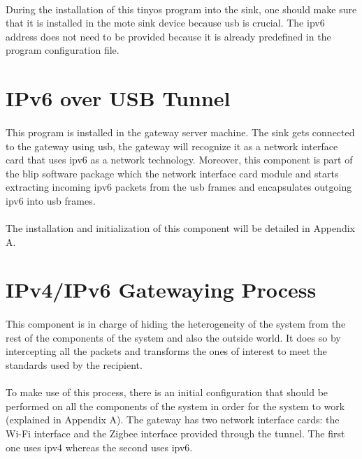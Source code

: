 \documentclass[12pt,a4paper,final]{report}
\begin{document}
\paragraph{}
During the installation of this \gls{tinyos} program into the sink, one should make sure that it is installed in the mote sink device because \gls{usb} is crucial. The \gls{ipv6} address does not need to be provided because it is already predefined in the program configuration file.

\section{IPv6 over USB Tunnel}
\paragraph{}
This program is installed in the gateway server machine. The sink gets connected to the gateway using \gls{usb}, the gateway will recognize it as a network interface card that uses \gls{ipv6} as a network technology. Moreover, this component is part of the \gls{blip} software package which the network interface card module and starts extracting incoming \gls{ipv6} packets from the \gls{usb} frames and encapsulates outgoing \gls{ipv6} into \gls{usb} frames.
\paragraph{}
The installation and initialization of this component will be detailed in Appendix A.
\section{IPv4/IPv6 Gatewaying Process}
\paragraph{}
This component is in charge of hiding the heterogeneity of the system from the rest of the components of the system and also the outside world. It does so by intercepting all the packets and transforms the ones of interest to meet the standards used by the recipient.
\paragraph{}
To make use of this process, there is an initial configuration that should be performed on all the components of the system in order for the system to work (explained in Appendix A). The gateway has two network interface cards: the Wi-Fi interface and the Zigbee interface provided through the tunnel. The first one uses \gls{ipv4} whereas the second uses \gls{ipv6}.
\end{document}
